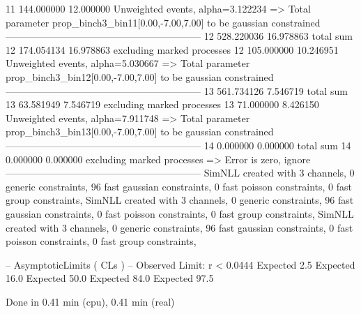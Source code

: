 11         144.000000      12.000000       Unweighted events, alpha=3.122234
  => Total parameter prop_binch3_bin11[0.00,-7.00,7.00] to be gaussian constrained
------------------------------------------------------------
12         528.220036      16.978863       total sum                     
12         174.054134      16.978863       excluding marked processes    
12         105.000000      10.246951       Unweighted events, alpha=5.030667
  => Total parameter prop_binch3_bin12[0.00,-7.00,7.00] to be gaussian constrained
------------------------------------------------------------
13         561.734126      7.546719        total sum                     
13         63.581949       7.546719        excluding marked processes    
13         71.000000       8.426150        Unweighted events, alpha=7.911748
  => Total parameter prop_binch3_bin13[0.00,-7.00,7.00] to be gaussian constrained
------------------------------------------------------------
14         0.000000        0.000000        total sum                     
14         0.000000        0.000000        excluding marked processes    
  => Error is zero, ignore      
------------------------------------------------------------
SimNLL created with 3 channels, 0 generic constraints, 96 fast gaussian constraints, 0 fast poisson constraints, 0 fast group constraints, 
SimNLL created with 3 channels, 0 generic constraints, 96 fast gaussian constraints, 0 fast poisson constraints, 0 fast group constraints, 
SimNLL created with 3 channels, 0 generic constraints, 96 fast gaussian constraints, 0 fast poisson constraints, 0 fast group constraints, 

 -- AsymptoticLimits ( CLs ) --
Observed Limit: r < 0.0444
Expected  2.5%
Expected 16.0%
Expected 50.0%
Expected 84.0%
Expected 97.5%

Done in 0.41 min (cpu), 0.41 min (real)
